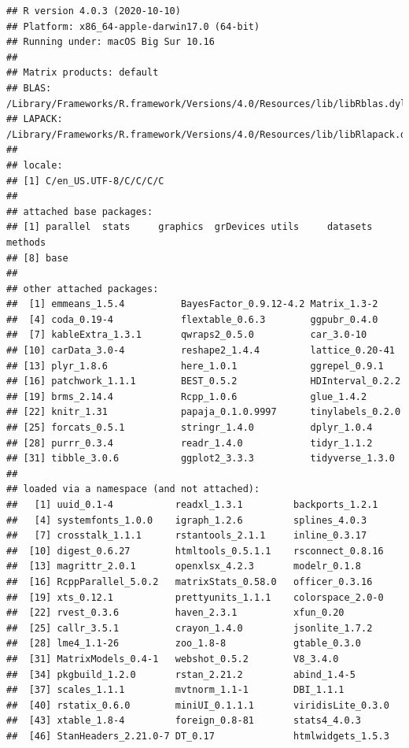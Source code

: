 \documentclass[
  11pt,
  english,
  ,doc,floatsintext]{apa6}
\begin{document}
\begin{verbatim}
## R version 4.0.3 (2020-10-10)
## Platform: x86_64-apple-darwin17.0 (64-bit)
## Running under: macOS Big Sur 10.16
## 
## Matrix products: default
## BLAS:   /Library/Frameworks/R.framework/Versions/4.0/Resources/lib/libRblas.dylib
## LAPACK: /Library/Frameworks/R.framework/Versions/4.0/Resources/lib/libRlapack.dylib
## 
## locale:
## [1] C/en_US.UTF-8/C/C/C/C
## 
## attached base packages:
## [1] parallel  stats     graphics  grDevices utils     datasets  methods  
## [8] base     
## 
## other attached packages:
##  [1] emmeans_1.5.4          BayesFactor_0.9.12-4.2 Matrix_1.3-2          
##  [4] coda_0.19-4            flextable_0.6.3        ggpubr_0.4.0          
##  [7] kableExtra_1.3.1       qwraps2_0.5.0          car_3.0-10            
## [10] carData_3.0-4          reshape2_1.4.4         lattice_0.20-41       
## [13] plyr_1.8.6             here_1.0.1             ggrepel_0.9.1         
## [16] patchwork_1.1.1        BEST_0.5.2             HDInterval_0.2.2      
## [19] brms_2.14.4            Rcpp_1.0.6             glue_1.4.2            
## [22] knitr_1.31             papaja_0.1.0.9997      tinylabels_0.2.0      
## [25] forcats_0.5.1          stringr_1.4.0          dplyr_1.0.4           
## [28] purrr_0.3.4            readr_1.4.0            tidyr_1.1.2           
## [31] tibble_3.0.6           ggplot2_3.3.3          tidyverse_1.3.0       
## 
## loaded via a namespace (and not attached):
##   [1] uuid_0.1-4           readxl_1.3.1         backports_1.2.1     
##   [4] systemfonts_1.0.0    igraph_1.2.6         splines_4.0.3       
##   [7] crosstalk_1.1.1      rstantools_2.1.1     inline_0.3.17       
##  [10] digest_0.6.27        htmltools_0.5.1.1    rsconnect_0.8.16    
##  [13] magrittr_2.0.1       openxlsx_4.2.3       modelr_0.1.8        
##  [16] RcppParallel_5.0.2   matrixStats_0.58.0   officer_0.3.16      
##  [19] xts_0.12.1           prettyunits_1.1.1    colorspace_2.0-0    
##  [22] rvest_0.3.6          haven_2.3.1          xfun_0.20           
##  [25] callr_3.5.1          crayon_1.4.0         jsonlite_1.7.2      
##  [28] lme4_1.1-26          zoo_1.8-8            gtable_0.3.0        
##  [31] MatrixModels_0.4-1   webshot_0.5.2        V8_3.4.0            
##  [34] pkgbuild_1.2.0       rstan_2.21.2         abind_1.4-5         
##  [37] scales_1.1.1         mvtnorm_1.1-1        DBI_1.1.1           
##  [40] rstatix_0.6.0        miniUI_0.1.1.1       viridisLite_0.3.0   
##  [43] xtable_1.8-4         foreign_0.8-81       stats4_4.0.3        
##  [46] StanHeaders_2.21.0-7 DT_0.17              htmlwidgets_1.5.3   

\end{verbatim}
\end{document}

